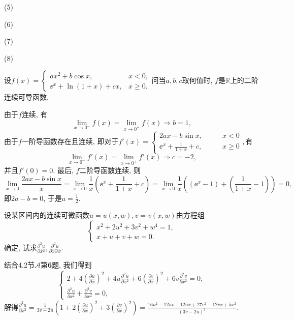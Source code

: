 \begin{quiza}
\begin{solution}
(5)

(6)

(7)

(8)
\end{solution}
\woe 设\(f(x)=\begin{cases}
      ax^2+b\cos x,\qquad &x<0,\\\ee^{x}+\ln(1+x)+cx,&x\geqslant 0.
  \end{cases}\)问当\(a,b,c\)取何值时, \(f\)是\(\mathbb{R}\)上的二阶连续可导函数.
\begin{solution}
由于\(f\)连续, 有\[\lim_{x\rightarrow 0^-}f(x)=\lim_{x\rightarrow 0^+}f(x)\Rightarrow b=1,\]由于\(f\)一阶导函数存在且连续, 即对于\(f'(x)=\begin{cases}
2ax-b\sin x,\qquad &x<0\\
\ee^x+\frac{1}{1+x}+c,&x\geqslant 0
\end{cases},\)有\[\lim_{x\rightarrow 0^-}f'(x)=\lim_{x\rightarrow 0^+}f'(x)\Rightarrow c=-2,\]并且\(f'(0)=0\). 最后, \(f\)二阶导函数连续, 则\[\lim_{x\rightarrow 0}\frac{2ax-b\sin x}{x}=\lim_{x\rightarrow 0}\frac{1}{x}\left(\ee^x+\frac{1}{1+x}+c\right)=\lim_{x\rightarrow 0}\frac{1}{x}\left(\left(\ee^x-1\right)+\left(\frac{1}{1+x}-1\right)\right)=0,\]即\(2a-b=0\), 于是\(a=\frac{1}{2}\).
\end{solution}
\woe 设某区间内的连续可微函数\(u=u(x,w),v=v(x,w)\)由方程组\[\begin{cases}
    x^2+2u^2+3v^2+w^4=1,\\x+u+v+w=0.
\end{cases}\]确定, 试求\(\frac{\partial^2u}{\partial x^2},\frac{\partial^2u}{\partial x\partial w}\).
\begin{solution}
结合4.2节\(\boldsymbol{\mathcal{A}}\)第\textbf{6}题, 我们得到\[\begin{cases}
2+4\left(\frac{\partial u}{\partial x}\right)^2+4u\frac{\partial^2u}{\partial x^2}+6\left(\frac{\partial v}{\partial x}\right)^2+6v\frac{\partial^2v}{\partial x^2}=0,\\
\frac{\partial^2u}{\partial x^2}+\frac{\partial^2v}{\partial x^2}=0,
\end{cases}\]解得\(\frac{\partial^2u}{\partial x^2}=\frac{1}{3v-2u}\left(1+2\left(\frac{\partial u}{\partial x}\right)^2+3\left(\frac{\partial v}{\partial x}\right)^2\right)=\frac{16u^2-12uv-12ux+27v^2-12vx+5x^2}{(3v-2u)^3}.\)


\end{solution}
\end{quiza}
